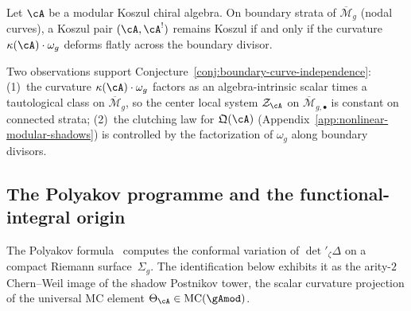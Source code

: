 \begin{conjecture}
\label{conj:boundary-curve-independence}
\label{conj:stratified-curve-independence}
\ClaimStatusConjectured
{}
Let $\cA$ be a modular Koszul chiral algebra.
On boundary strata of $\overline{\mathcal{M}}_g$
(nodal curves), a Koszul pair $(\cA, \cA^!)$ remains
Koszul if and only if the curvature
$\kappa(\cA) \cdot \omega_g$ deforms flatly across
the boundary divisor.
\end{conjecture}

\begin{remark}
\label{rem:curve-independence-evidence}
Two observations support
Conjecture~\textup{\ref{conj:boundary-curve-independence}}:
\textup{(1)}~the curvature $\kappa(\cA) \cdot \omega_g$
factors as an algebra-intrinsic scalar times a
tautological class on $\overline{\mathcal{M}}_g$, so the
center local system $\mathcal{Z}_\cA$ on
$\overline{\mathcal{M}}_{g,\bullet}$ is constant on
connected strata;
\textup{(2)}~the clutching law for $\mathfrak{Q}(\cA)$
(Appendix~\ref{app:nonlinear-modular-shadows}) is
controlled by the factorization of $\omega_g$ along
boundary divisors.
\end{remark}


\subsection{The Polyakov programme and the functional-integral origin}
\label{subsec:polyakov-programme}

The Polyakov formula~\cite{Polyakov1981} computes the conformal
variation of $\det'{}_\zeta \Delta$ on a compact Riemann
surface~$\Sigma_g$.
The identification below exhibits it as
the arity-$2$ Chern--Weil image of the shadow Postnikov
tower, the scalar curvature projection of the universal MC
element $\Theta_\cA \in \operatorname{MC}(\gAmod)$.


